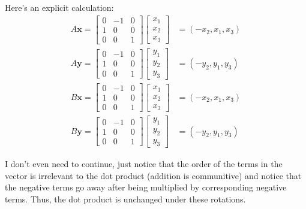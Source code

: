 \documentclass{article}
\begin{document}
Here's an explicit calculation:
\begin{align*}
A\mathbf x=\begin{bmatrix}
    0 & -1 & 0 \\
    1 & 0 & 0 \\
    0 & 0 & 1
\end{bmatrix}\begin{bmatrix}
    x_1 \\
    x_2 \\
    x_3
\end{bmatrix}&=(-x_2,x_1,x_3)\\
A\mathbf y=\begin{bmatrix}
    0 & -1 & 0 \\
    1 & 0 & 0 \\
    0 & 0 & 1
\end{bmatrix}\begin{bmatrix}
    y_1 \\
    y_2 \\
    y_3
\end{bmatrix}&=(-y_2,y_1,y_3)\\
B\mathbf x=\begin{bmatrix}
    0 & -1 & 0 \\
    1 & 0 & 0 \\
    0 & 0 & 1
\end{bmatrix}\begin{bmatrix}
    x_1 \\
    x_2 \\
    x_3
\end{bmatrix}&=(-x_2,x_1,x_3)\\
B\mathbf y=\begin{bmatrix}
    0 & -1 & 0 \\
    1 & 0 & 0 \\
    0 & 0 & 1
\end{bmatrix}\begin{bmatrix}
    y_1 \\
    y_2 \\
    y_3
\end{bmatrix}&=(-y_2,y_1,y_3)
\end{align*}

I don't even need to continue, just notice that the order of the terms in the vector is irrelevant to the dot product (addition is communitive) and notice that the negative terms go away after being multiplied by corresponding negative terms. Thus, the dot product is unchanged under these rotations.
\end{document}
